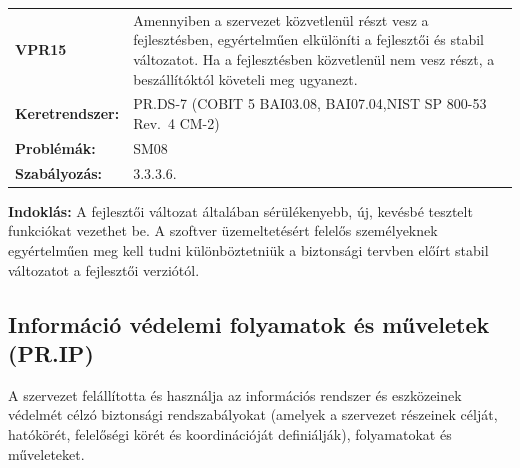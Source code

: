 \documentclass[12pt,magyar,a4paper,oneside]{scrreprt}
\begin{document}
\begin{longtable}[]{@{}ll@{}}
\toprule
\endhead
\begin{minipage}[t]{0.16\columnwidth}\raggedright
\textbf{VPR15}\strut
\end{minipage} & \begin{minipage}[t]{0.79\columnwidth}\raggedright
Amennyiben a szervezet közvetlenül részt vesz a fejlesztésben,
egyértelműen elkülöníti a fejlesztői és stabil változatot. Ha a
fejlesztésben közvetlenül nem vesz részt, a beszállítóktól követeli meg
ugyanezt.\strut
\end{minipage}\tabularnewline
\begin{minipage}[t]{0.16\columnwidth}\raggedright
\textbf{Keretrendszer:}\strut
\end{minipage} & \begin{minipage}[t]{0.79\columnwidth}\raggedright
PR.DS-7 (COBIT 5 BAI03.08, BAI07.04,NIST SP 800-53 Rev.~4 CM-2)\strut
\end{minipage}\tabularnewline
\begin{minipage}[t]{0.16\columnwidth}\raggedright
\textbf{Problémák:}\strut
\end{minipage} & \begin{minipage}[t]{0.79\columnwidth}\raggedright
SM08\strut
\end{minipage}\tabularnewline
\begin{minipage}[t]{0.16\columnwidth}\raggedright
\textbf{Szabályozás:}\strut
\end{minipage} & \begin{minipage}[t]{0.79\columnwidth}\raggedright
3.3.3.6.\strut
\end{minipage}\tabularnewline
\bottomrule
\end{longtable}

\textbf{Indoklás: } A fejlesztői változat általában sérülékenyebb, új,
kevésbé tesztelt funkciókat vezethet be. A szoftver üzemeltetésért
felelős személyeknek egyértelműen meg kell tudni különböztetniük a
biztonsági tervben előírt stabil változatot a fejlesztői verziótól.

\hypertarget{informuxe1ciuxf3-vuxe9delemi-folyamatok-uxe9s-mux171veletek-pr.ip}{%
\subsection{Információ védelemi folyamatok és műveletek
(PR.IP)}\label{informuxe1ciuxf3-vuxe9delemi-folyamatok-uxe9s-mux171veletek-pr.ip}}

A szervezet felállította és használja az információs rendszer és
eszközeinek védelmét célzó biztonsági rendszabályokat (amelyek a
szervezet részeinek célját, hatókörét, felelőségi körét és
koordinációját definiálják), folyamatokat és műveleteket.
\end{document}
